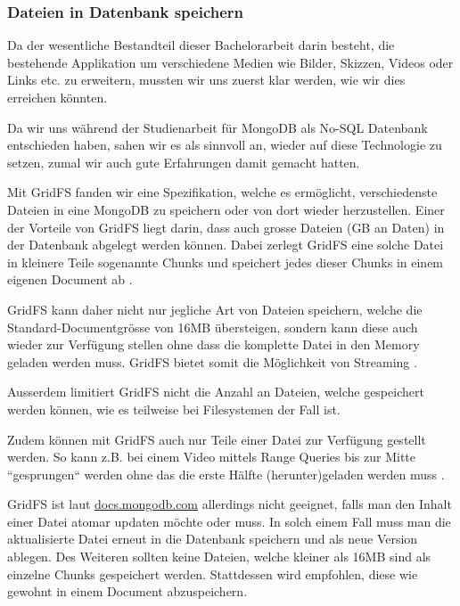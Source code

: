 \subsubsection{Dateien in Datenbank speichern}
\label{seq:save_file_in_db}
Da der wesentliche Bestandteil dieser Bachelorarbeit darin besteht, die bestehende Applikation um verschiedene Medien wie Bilder, Skizzen, Videos oder Links etc. zu erweitern, mussten wir uns zuerst klar werden, wie wir dies erreichen könnten.

Da wir uns während der Studienarbeit \cite{methode635-sa} für MongoDB als No-SQL Datenbank entschieden haben, sahen wir es als sinnvoll an, wieder auf diese Technologie zu setzen, zumal wir auch gute Erfahrungen damit gemacht hatten.

Mit GridFS \cite{gridfs-mongodb}\cite{gridfs-mongodb-async-driver} fanden wir eine Spezifikation, welche es ermöglicht, verschiedenste Dateien in eine MongoDB zu speichern oder von dort wieder herzustellen. Einer der Vorteile von GridFS liegt darin, dass auch grosse Dateien (GB an Daten) in der Datenbank abgelegt werden können. Dabei zerlegt GridFS eine solche Datei in kleinere Teile sogenannte Chunks und speichert jedes dieser Chunks in einem eigenen Document ab \cite{gridfs-mongodb}.

GridFS kann daher nicht nur jegliche Art von Dateien speichern, welche die Standard-Documentgrösse von 16MB übersteigen, sondern kann diese auch wieder zur Verfügung stellen ohne dass die komplette Datei in den Memory geladen werden muss. GridFS bietet somit die Möglichkeit von Streaming \cite{gridfs-chunking}.

Ausserdem limitiert GridFS nicht die Anzahl an Dateien, welche gespeichert werden können, wie es teilweise bei Filesystemen der Fall ist.

Zudem können mit GridFS auch nur Teile einer Datei zur Verfügung gestellt werden. So kann z.B. bei einem Video mittels Range Queries bis zur Mitte ``gesprungen`` werden ohne das die erste Hälfte (herunter)geladen werden muss \cite{gridfs-mongodb}.

GridFS ist laut \href{https://docs.mongodb.com/manual/core/gridfs/}{docs.mongodb.com} allerdings nicht geeignet, falls man den Inhalt einer Datei atomar updaten möchte oder muss. In solch einem Fall muss man die aktualisierte Datei erneut in die Datenbank speichern und als neue Version ablegen. Des Weiteren sollten keine Dateien, welche kleiner als 16MB sind als einzelne Chunks gespeichert werden. Stattdessen wird empfohlen, diese wie gewohnt in einem Document abzuspeichern.

